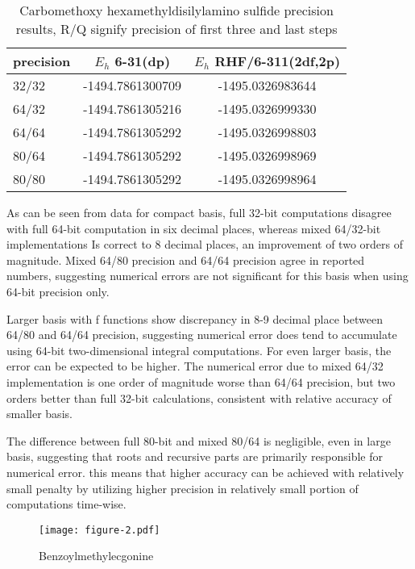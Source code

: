 \documentclass[12pt]{article}
\begin{document}
\begin {table}
\label{table-1}
\caption {Carbomethoxy hexamethyldisilylamino sulfide precision results,
  R/Q signify precision of first three and last steps}
\begin{center}
  \begin{tabular}{| l | c | c |}
    \hline
    precision & $E_h$ 6-31(dp) & $E_h$ RHF/6-311(2df,2p) \\ \hline
    32/32 & -1494.7861300709 & -1495.0326983644 \\ \hline
    64/32 & -1494.7861305216 & -1495.0326999330 \\ \hline
    64/64 & -1494.7861305292 & -1495.0326998803 \\ \hline
    80/64 & -1494.7861305292 & -1495.0326998969 \\ \hline
    80/80 & -1494.7861305292 & -1495.0326998964 \\
    \hline
  \end{tabular}
\end{center}
  \end{table}

As can be seen from data for compact basis, full 32-bit computations disagree with full 64-bit computation in six decimal places, whereas mixed 64/32-bit implementations
Is correct to 8 decimal places, an improvement of two orders of magnitude.
 Mixed 64/80 precision and 64/64 precision agree in reported numbers, suggesting
numerical errors are not significant for this basis when using 64-bit precision only.

Larger basis with f functions show discrepancy in 8-9 decimal place between 64/80
 and 64/64 precision, suggesting numerical error does tend to accumulate using 64-bit
two-dimensional integral computations.
For even larger basis, the error can be expected to be higher.
The numerical error due to mixed 64/32 implementation is one order of magnitude worse than 64/64 precision, but two orders better than full 32-bit calculations,
consistent with relative accuracy of smaller basis.

The difference between full 80-bit and mixed 80/64 is negligible, even in large basis, suggesting that roots and recursive parts are primarily responsible
for numerical error.  this means that higher accuracy can be achieved with relatively small penalty by utilizing higher precision in relatively small portion
of computations time-wise.

\begin{figure}
  \begin{center}
    \texttt{[image: figure-2.pdf]}
  \end{center}
  \caption{Benzoylmethylecgonine}
\label{figure:2}
\end{figure}
\end{document}
